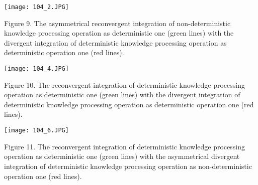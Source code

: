 \documentclass{article}
\begin{document}
\begin{multicols}{2}
\vspace{20pt}

\begin{center}
\texttt{[image: 104\_2.JPG]} 
\end{center}
\vspace{0.5pt}
\scriptsize Figure 9. The asymmetrical reconvergent integration of non-deterministic knowledge processing operation as deterministic one
(green lines) with the divergent integration of deterministic knowledge
processing operation as deterministic operation one (red lines).

\begin{center}
\texttt{[image: 104\_4.JPG]}
\end{center}
\vspace{0.5pt}
\scriptsize Figure 10. The reconvergent integration of deterministic knowledge
processing operation as deterministic one (green lines) with the
divergent integration of deterministic knowledge processing operation
as deterministic operation one (red lines).
\vspace{0.5cm}

\begin{center}
\texttt{[image: 104\_6.JPG]}
\end{center}
\vspace{0.5pt}
\scriptsize Figure 11. The reconvergent integration of deterministic knowledge
processing operation as deterministic one (green lines) with the asymmetrical divergent integration of deterministic knowledge processing
operation as non-deterministic operation one (red lines).

\end{multicols}
\end{document}
